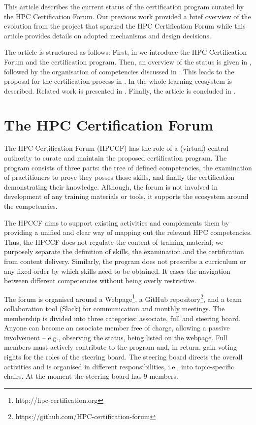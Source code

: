 \documentclass[jocse]{jocseart}
\begin{document}
This article describes the current status of the certification program curated by the HPC Certification Forum.
Our previous work provided a brief overview of the evolution from the project that sparked the HPC Certification Forum \cite{TAHCPKHHSS19} while this article provides details on adopted mechanisms and design decisions.

The article is structured as follows:
First, in  we introduce the HPC Certification Forum and the certification program.
Then, an overview of the status is given in , followed by the organisation of competencies discussed in .
This leads to the proposal for the certification process in .
In  the whole learning ecosystem is described.
Related work is presented in .
Finally, the article is concluded in .

\section{The HPC Certification Forum}
\label{sec:forum}

The HPC Certification Forum (HPCCF) has the role of a (virtual) central authority to curate and maintain the proposed certification program.
The program consists of three parts: the tree of defined competencies, the examination of practitioners to prove they posses those skills, and finally the certification demonstrating their knowledge.
Although, the forum is not involved in development of any training materials or tools, it supports the ecosystem around the competencies.

The HPCCF aims to support existing activities and complements them by providing a unified and clear way of mapping out the relevant HPC competencies.
Thus, the HPCCF does not regulate the content of training material; we purposely separate the definition of skills, the examination and the certification from content delivery.
Similarly, the program does not prescribe a curriculum or any fixed order by which skills need to be obtained. It eases the navigation between different competencies without being overly restrictive.

The forum is organised around a Webpage\footnote{http://hpc-certification.org},  a GitHub repository\footnote{https://github.com/HPC-certification-forum},  and a team collaboration tool (Slack) for communication and monthly meetings.
The membership is divided into three categories: associate, full and steering board.
Anyone can become an associate member free of charge, allowing a passive involvement -- e.g., observing the status, being listed on the webpage.
Full members must actively contribute to the program and, in return, gain voting rights for the roles of the steering board.
The steering board directs the overall activities and is organised in different responsibilities, i.e., into topic-specific chairs. At the moment the steering board has 9 members.
\end{document}
